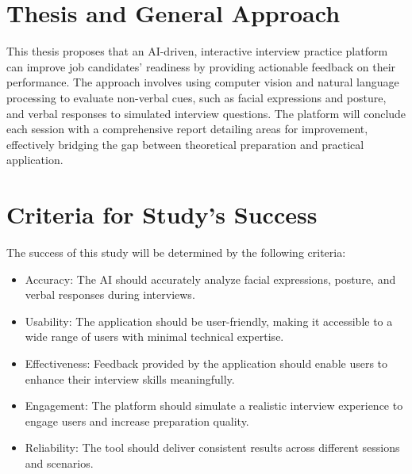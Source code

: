 \section{Thesis and General Approach}

This thesis proposes that an AI-driven, interactive interview practice platform can improve job candidates' readiness by providing actionable feedback on their performance. The approach involves using computer vision and natural language processing to evaluate non-verbal cues, such as facial expressions and posture, and verbal responses to simulated interview questions. The platform will conclude each session with a comprehensive report detailing areas for improvement, effectively bridging the gap between theoretical preparation and practical application.

\section{Criteria for Study’s Success}

The success of this study will be determined by the following criteria:

\begin{itemize} \item Accuracy: The AI should accurately analyze facial expressions, posture, and verbal responses during interviews. \item Usability: The application should be user-friendly, making it accessible to a wide range of users with minimal technical expertise. \item Effectiveness: Feedback provided by the application should enable users to enhance their interview skills meaningfully. \item Engagement: The platform should simulate a realistic interview experience to engage users and increase preparation quality. \item Reliability: The tool should deliver consistent results across different sessions and scenarios. \end{itemize}